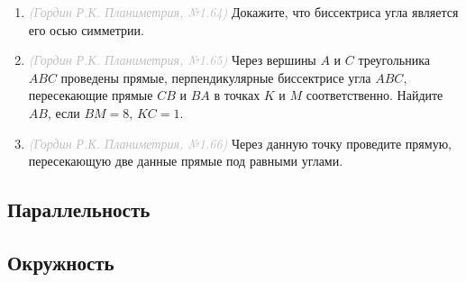\documentclass[10pt, a4paper]{article}
\newcommand{\source}[1]{\textcolor{silver}{\textit{(#1)}}}
\begin{document}
\begin{enumerate}
		\item \source{Гордин Р.К. Планиметрия, №1.64} Докажите, что биссектриса угла является его осью симметрии.
		\item \source{Гордин Р.К. Планиметрия, №1.65} Через вершины $A$ и $C$ треугольника $ABC$ проведены прямые, перпендикулярные биссектрисе угла $ABC$, пересекающие прямые $CB$ и $BA$ в точках $K$ и $M$ соответственно. Найдите $AB$, если $BM = 8$, $KC = 1$.
		\item \source{Гордин Р.К. Планиметрия, №1.66} Через данную точку проведите прямую, пересекающую две данные прямые под равными углами.
	\end{enumerate}
\subsection{Параллельность}
\subsection{Окружность}
\end{document}
